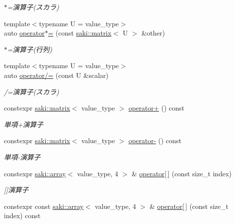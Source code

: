 \begin{DoxyCompactItemize}
\begin{DoxyCompactList}\small\item\em $\ast$=演算子(スカラ) \end{DoxyCompactList}\item 
{\footnotesize template$<$typename U  = value\+\_\+type$>$ }\\auto \mbox{\hyperlink{classsaki_1_1matrix_acb32e13e61d31a15341fbf2996f6428b}{operator$\ast$=}} (const \mbox{\hyperlink{classsaki_1_1matrix}{saki\+::matrix}}$<$ U $>$ \&other)
\begin{DoxyCompactList}\small\item\em $\ast$=演算子(行列) \end{DoxyCompactList}\item 
{\footnotesize template$<$typename U  = value\+\_\+type$>$ }\\auto \mbox{\hyperlink{classsaki_1_1matrix_af70c929f45bbea2192aab47d49882d3c}{operator/=}} (const U \&scalar)
\begin{DoxyCompactList}\small\item\em /=演算子(スカラ) \end{DoxyCompactList}\item 
constexpr \mbox{\hyperlink{classsaki_1_1matrix}{saki\+::matrix}}$<$ value\+\_\+type $>$ \mbox{\hyperlink{classsaki_1_1matrix_ada12f77277660f640f46c9bc7e67c04c}{operator+}} () const
\begin{DoxyCompactList}\small\item\em 単項+演算子 \end{DoxyCompactList}\item 
constexpr \mbox{\hyperlink{classsaki_1_1matrix}{saki\+::matrix}}$<$ value\+\_\+type $>$ \mbox{\hyperlink{classsaki_1_1matrix_a11aa55aa5c0efdc11c93c6a80188ac62}{operator-\/}} () const
\begin{DoxyCompactList}\small\item\em 単項-\/演算子 \end{DoxyCompactList}\item 
constexpr \mbox{\hyperlink{classsaki_1_1array}{saki\+::array}}$<$ value\+\_\+type, 4 $>$ \& \mbox{\hyperlink{classsaki_1_1matrix_a9438f349876b7932a5c3c58a713e3e00}{operator\mbox{[}$\,$\mbox{]}}} (const size\+\_\+t index)
\begin{DoxyCompactList}\small\item\em \mbox{[}\mbox{]}演算子 \end{DoxyCompactList}\item 
constexpr const \mbox{\hyperlink{classsaki_1_1array}{saki\+::array}}$<$ value\+\_\+type, 4 $>$ \& \mbox{\hyperlink{classsaki_1_1matrix_a1a326fe310df8da04d32200dd6ae1e64}{operator\mbox{[}$\,$\mbox{]}}} (const size\+\_\+t index) const

\end{DoxyCompactItemize}
